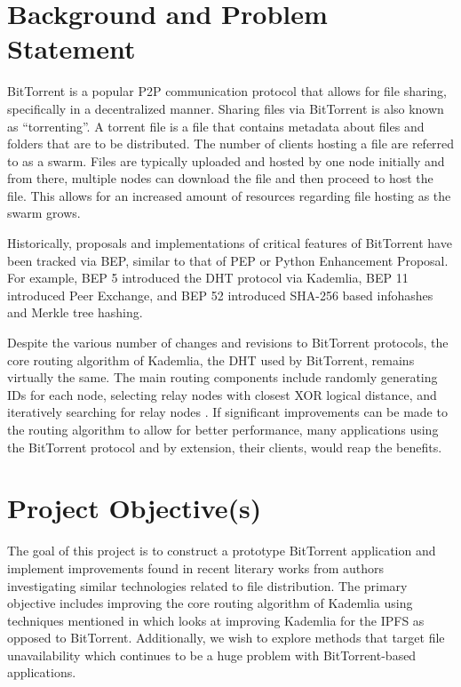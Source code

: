 \section{Background and Problem Statement}
BitTorrent is a popular \ac{P2P} communication protocol that allows for file sharing, specifically in a decentralized manner. Sharing files via BitTorrent is also known as ``torrenting''. A torrent file is a file that contains metadata about files and folders that are to be distributed. The number of clients hosting a file are referred to as a swarm. Files are typically uploaded and hosted by one node initially and from there, multiple nodes can download the file and then proceed to host the file. This allows for an increased amount of resources regarding file hosting as the swarm grows. 

Historically, proposals and implementations of critical features of BitTorrent have been tracked via \ac{BEP}, similar to that of PEP or Python Enhancement Proposal. For example, BEP 5 introduced the DHT protocol via Kademlia, BEP 11 introduced Peer Exchange, and BEP 52 introduced SHA-256 based infohashes and Merkle tree hashing.

Despite the various number of changes and revisions to BitTorrent protocols, the core routing algorithm of Kademlia, the \ac{DHT} used by BitTorrent, remains virtually the same. The main routing components include randomly generating IDs for each node, selecting relay nodes with closest XOR logical distance, and iteratively searching for relay nodes \cite{KademliaRouting}. If significant improvements can be made to the routing algorithm to allow for better performance, many applications using the BitTorrent protocol and by extension, their clients, would reap the benefits. 



\section{Project Objective(s)}
The goal of this project is to construct a prototype BitTorrent application and implement improvements found in recent literary works from authors investigating similar technologies related to file distribution. The primary objective includes improving the core routing algorithm of Kademlia using techniques mentioned in \cite{KademliaRouting} which looks at improving Kademlia for the \ac{IPFS} as opposed to BitTorrent. Additionally, we wish to explore methods that target file unavailability which continues to be a huge problem with BitTorrent-based applications. 